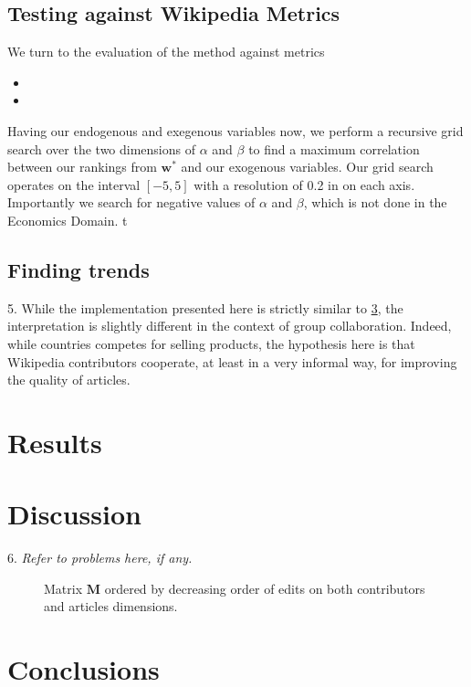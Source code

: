 \documentclass{acm_proc_article-sp}
\begin{document}
\subsection{Testing against Wikipedia Metrics}
We turn to the evaluation of the method against metrics 

\begin{itemize}
  \item 
  \item 
\end{itemize}


Having our endogenous and exegenous variables now, we perform a recursive grid search over the two dimensions of $\alpha$ and $\beta$ to find a maximum correlation between our rankings from $\mathbf{w^*}$ and our exogenous variables. Our grid search operates on the interval $[-5,5]$ with a resolution of 0.2 in on each axis. Importantly we search for negative values of $\alpha$ and $\beta$, which is not done in the Economics Domain. t

\subsection{Finding trends}

5. While the implementation presented here is strictly similar to \ref{}, the interpretation is slightly different in the context of group collaboration. Indeed, while countries competes for selling products, the hypothesis here is that Wikipedia contributors cooperate, at least in a very informal way, for improving the quality of articles.

\section{Results}




\section{Discussion}

6. {\it Refer to problems here, if any.}




\begin{figure}
\centering
\caption{Matrix $\mathbf{M}$ ordered by decreasing order of edits on both contributors and articles dimensions.}
\label{fig:matrix}
\end{figure}

\section{Conclusions}
\end{document}
